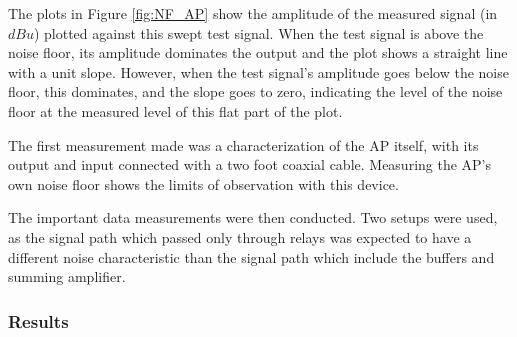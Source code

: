 		The plots in Figure \ref{fig:NF_AP} show the amplitude of the measured signal (in $dBu$) plotted against this swept test signal.  When the test signal is above the noise floor, its amplitude dominates the output and the plot shows a straight line with a unit slope.  However, when the test signal's amplitude goes below the noise floor, this dominates, and the slope goes to zero, indicating the level of the noise floor at the measured level of this flat part of the plot.

		The first measurement made was a characterization of the AP itself, with its output and input connected with a two foot coaxial cable.  Measuring the AP's own noise floor shows the limits of observation with this device.

		The important data measurements were then conducted.  Two setups were used, as the signal path which passed only through relays was expected to have a different noise characteristic than the signal path which include the buffers and summing amplifier.

		\subsubsection{Results}


